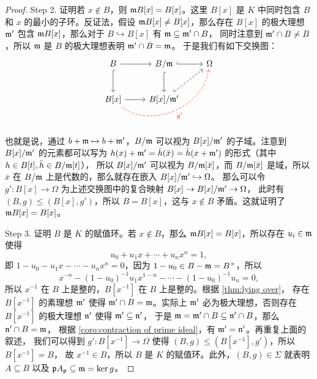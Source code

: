 \begin{proof}
  Step 2. 证明若 $x\notin B$，则 $\mathfrak{m}B[x]=B[x]$。这里 $B[x]$ 是 $K$ 中同时包含 $B$
  和 $x$ 的最小的子环。反证法，假设 $\mathfrak{m}B[x]\neq B[x]$，那么存在 $B[x]$ 的极大理想 $\mathfrak{m}'$
  包含 $\mathfrak{m}B[x]$，那么对于 $B\hookrightarrow B[x]$ 有 $\mathfrak{m}\subseteq\mathfrak{m}'\cap B$，
  同时注意到 $\mathfrak{m}'\cap B\neq B$，所以 $\mathfrak{m}$ 是 $B$ 的极大理想表明 $\mathfrak{m}'\cap B=\mathfrak{m}$。
  于是我们有如下交换图：
  \[
    \begin{tikzcd}[row sep=2.4em]
      B\arrow[r]\arrow[d,hookrightarrow] 
      & B/\ideal m\arrow[r,hookrightarrow]\arrow[d,hookrightarrow] 
      & \Omega \\
      B[x]\arrow[r]\arrow[urr,dashed,red,bend right=60,"g'"'] 
      & B[x]/\ideal m'\arrow[ur,dashed,hookrightarrow] &
    \end{tikzcd}  
  \]
  \vskip-10pt \noindent
  也就是说，通过 $b+\mathfrak{m}\mapsto b+\mathfrak{m}'$，$B/\mathfrak{m}$ 可以视为
  $B[x]/\mathfrak{m}'$ 的子域。注意到 $B[x]/\mathfrak{m}'$ 的元素都可以写为
  $h(x)+\mathfrak{m}'=\bar h(\bar x)=\bar h(x+\mathfrak{m}')$ 的形式（其中 $h\in B[t],\bar h\in B/\mathfrak{m}[t]$），
  所以 $B[x]/\mathfrak{m}'$ 可以视为 $B/\mathfrak{m}[\bar x]$，而 $B/\mathfrak{m}[\bar x]$ 是域，所以
  $\bar x$ 在 $B/\mathfrak{m}$ 上是代数的，那么就存在嵌入 $B[x]/\mathfrak{m}'\hookrightarrow\Omega$。
  那么可以令 $g':B[x]\to\Omega$ 为上述交换图中的复合映射 $B[x]\to B[x]/\mathfrak{m}'\to\Omega$，
  此时有 $(B,g)\leq (B[x],g')$，所以 $B=B[x]$，这与 $x\notin B$ 矛盾。这就证明了 $\mathfrak{m}B[x]=B[x]$。

  Step 3. 证明 $B$ 是 $K$ 的赋值环。若 $x\notin B$，那么 $\mathfrak{m}B[x]=B[x]$，所以存在
  $u_i\in\mathfrak{m}$ 使得
  \[
    u_0+u_1x+\cdots+u_nx^n=1,  
  \]
  即 $1-u_0-u_1x-\cdots-u_nx^n=0$，因为 $1-u_0\in B-\mathfrak{m}=B^\times$，所以
  \[
    x^{-n}-(1-u_0)^{-1}u_1x^{1-n}-\cdots-(1-u_0)^{-1}u_n=0, 
  \]
  所以 $x^{-1}$ 在 $B$ 上是整的，$B[x^{-1}]$ 在 $B$ 上是整的。根据 \autoref{thm:lying over}，
  存在 $B[x^{-1}]$ 的素理想 $\mathfrak{m}'$ 使得 $\mathfrak{m}'\cap B=\mathfrak{m}$。实际上 $\mathfrak{m}'$
  必为极大理想，否则存在 $B[x^{-1}]$ 的极大理想 $\mathfrak{n}'$ 使得 $\mathfrak{m}'\subseteq\mathfrak{n}'$，
  于是 $\mathfrak{m}=\mathfrak{m}'\cap B\subseteq\mathfrak{n}'\cap B$，那么 $\mathfrak{n}'\cap B=\mathfrak{m}$，
  根据 \autoref{coro:contraction of prime ideal}，有 $\mathfrak{m}'=\mathfrak{n}'$。再重复上面的叙述，
  我们可以得到 $g':B[x^{-1}]\to\Omega$ 使得 $(B,g)\leq (B[x^{-1}],g')$，所以 $B[x^{-1}]=B$，
  故 $x^{-1}\in B$，所以 $B$ 是 $K$ 的赋值环。此外，$(B,g)\in\Sigma$ 就表明
  $A\subseteq B$ 以及 $\mathfrak{p}A_{\mathfrak{p}}\subseteq\mathfrak{m}=\ker g$。
\end{proof}

